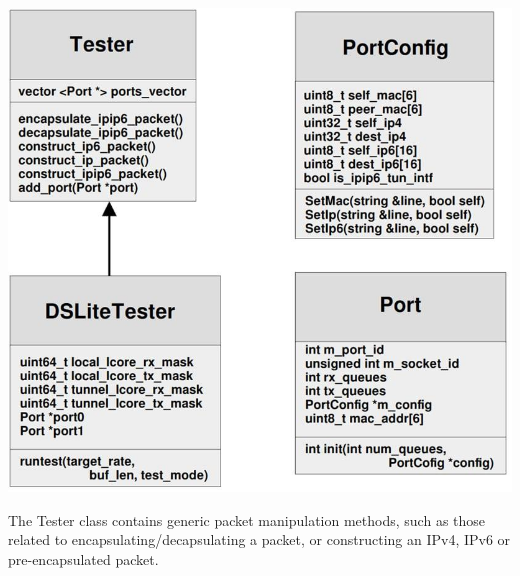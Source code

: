 \documentclass[a4paper,12p,titlepage]{article}
\begin{document}
\includegraphics[width=\textwidth]{classdiagram}

The Tester class contains generic packet manipulation methods, such as those related to encapsulating/decapsulating a packet, or constructing an IPv4, IPv6 or pre-encapsulated packet. 
\end{document}
